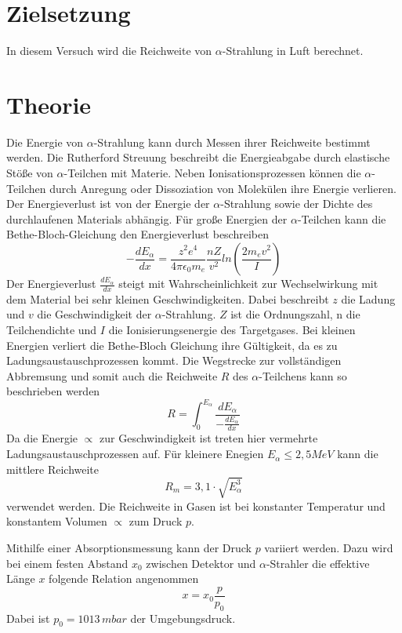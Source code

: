 \section{Zielsetzung}
In diesem Versuch wird die Reichweite von $\alpha$-Strahlung in Luft berechnet.
\section{Theorie}
Die Energie von $\alpha$-Strahlung kann durch Messen ihrer Reichweite bestimmt werden.
Die Rutherford Streuung beschreibt die Energieabgabe durch elastische Stöße von
$\alpha$-Teilchen mit Materie.
Neben Ionisationsprozessen können die $\alpha$-Teilchen durch Anregung oder
Dissoziation von Molekülen ihre Energie verlieren.
Der Energieverlust ist von der Energie der $\alpha$-Strahlung sowie der Dichte
des durchlaufenen Materials abhängig.
Für große Energien der $\alpha$-Teilchen kann die Bethe-Bloch-Gleichung
den Energieverlust beschreiben
\begin{equation*}
  -\frac{dE_{\alpha}}{dx} = \frac{z^2 e^4}{4 \pi \epsilon_0 m_e}\frac{nZ}{v^2} ln(\frac{2m_e v^2}{I})
  \label{eq:1}
\end{equation*}
Der Energieverlust $\frac{dE_{\alpha}}{dx}$ steigt mit Wahrscheinlichkeit zur Wechselwirkung mit
dem Material bei sehr kleinen Geschwindigkeiten.
Dabei beschreibt $z$ die Ladung und $v$ die Geschwindigkeit der $\alpha$-Strahlung.
$Z$ ist die Ordnungszahl, n die Teilchendichte und $I$ die Ionisierungsenergie
des Targetgases. Bei kleinen Energien verliert die Bethe-Bloch Gleichung ihre Gültigkeit,
da es zu Ladungsaustauschprozessen kommt.
Die Wegstrecke zur vollständigen Abbremsung
und somit auch die Reichweite $R$ des $\alpha$-Teilchens
kann so beschrieben werden
\begin{equation*}
  R = \int_{0}^{E_{\alpha}} \frac{dE_\alpha}{-\frac{dE_{\alpha}}{dx}}
  \label{eq:2}
\end{equation*}
Da die Energie $\propto $ zur Geschwindigkeit ist treten hier vermehrte Ladungsaustauschprozessen auf.
Für kleinere Enegien $E_\alpha \leq 2,5 MeV$ kann die mittlere Reichweite
\begin{equation}
  R_m= 3,1 \cdot \sqrt{E^3_\alpha}
  \label{eq:3}
\end{equation}
verwendet werden.
Die Reichweite in Gasen ist bei konstanter Temperatur und konstantem Volumen $\propto$ zum Druck $p$.

Mithilfe einer Absorptionsmessung kann der Druck $p$ variiert werden. Dazu
wird bei einem festen Abstand $x_0$ zwischen Detektor und $\alpha$-Strahler die
effektive Länge $x$ folgende Relation angenommen
\begin{equation}
  x = x_0 \frac{p}{p_0}
  \label{eq:4}
\end{equation}
Dabei ist $p_0 = 1013 \, mbar$ der Umgebungsdruck.
